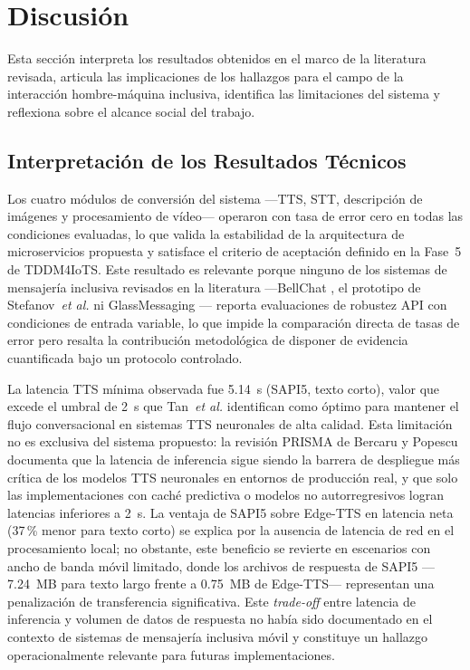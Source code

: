 \documentclass[journal]{IEEEtran}
\begin{document}
	\section{Discusi\'on}
	\label{sec:discusion}
	Esta secci\'on interpreta los resultados obtenidos en el marco de la literatura revisada, articula las implicaciones de los hallazgos para el campo de la interacci\'on hombre-m\'aquina inclusiva, identifica las limitaciones del sistema y reflexiona sobre el alcance social del trabajo.
	
	\subsection{Interpretaci\'on de los Resultados T\'ecnicos}
	Los cuatro m\'odulos de conversi\'on del sistema ---TTS, STT, descripci\'on de im\'agenes y procesamiento de v\'ideo--- operaron con tasa de error cero en todas las condiciones evaluadas, lo que valida la estabilidad de la arquitectura de microservicios propuesta y satisface el criterio de aceptaci\'on definido en la Fase~5 de TDDM4IoTS. Este resultado es relevante porque ninguno de los sistemas de mensajer\'ia inclusiva revisados en la literatura ---BellChat \cite{guerrero2021bellchat}, el prototipo de Stefanov~\textit{et al.} \cite{stefanov2024} ni GlassMessaging \cite{janaka2023}--- reporta evaluaciones de robustez API con condiciones de entrada variable, lo que impide la comparaci\'on directa de tasas de error pero resalta la contribuci\'on metodol\'ogica de disponer de evidencia cuantificada bajo un protocolo controlado.
	
	La latencia TTS m\'inima observada fue 5.14~s (SAPI5, texto corto), valor que excede el umbral de 2~s que Tan~\textit{et al.} \cite{tan2021} identifican como \'optimo para mantener el flujo conversacional en sistemas TTS neuronales de alta calidad. Esta limitaci\'on no es exclusiva del sistema propuesto: la revisi\'on PRISMA de Bercaru y Popescu \cite{bercaru2024} documenta que la latencia de inferencia sigue siendo la barrera de despliegue m\'as cr\'itica de los modelos TTS neuronales en entornos de producci\'on real, y que solo las implementaciones con cach\'e predictiva o modelos no autorregresivos logran latencias inferiores a 2~s. La ventaja de SAPI5 sobre Edge-TTS en latencia neta (37\,\% menor para texto corto) se explica por la ausencia de latencia de red en el procesamiento local; no obstante, este beneficio se revierte en escenarios con ancho de banda m\'ovil limitado, donde los archivos de respuesta de SAPI5 ---7.24~MB para texto largo frente a 0.75~MB de Edge-TTS--- representan una penalizaci\'on de transferencia significativa. Este \textit{trade-off} entre latencia de inferencia y volumen de datos de respuesta no hab\'ia sido documentado en el contexto de sistemas de mensajer\'ia inclusiva m\'ovil y constituye un hallazgo operacionalmente relevante para futuras implementaciones.
	
\end{document}
